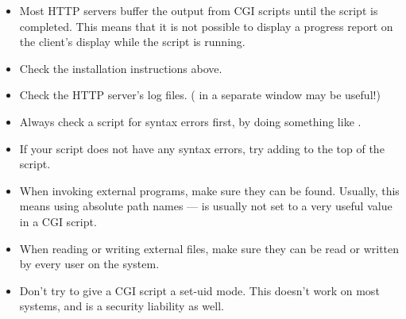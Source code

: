\begin{itemize}
\item Most HTTP servers buffer the output from CGI scripts until the
script is completed.  This means that it is not possible to display a
progress report on the client's display while the script is running.

\item Check the installation instructions above.

\item Check the HTTP server's log files.  ( in a
separate window may be useful!)

\item Always check a script for syntax errors first, by doing something
like .

\item If your script does not have any syntax errors, try adding
 to the top of the script.

\item When invoking external programs, make sure they can be found.
Usually, this means using absolute path names ---  is
usually not set to a very useful value in a CGI script.

\item When reading or writing external files, make sure they can be read
or written by every user on the system.

\item Don't try to give a CGI script a set-uid mode.  This doesn't work on
most systems, and is a security liability as well.
\end{itemize}

